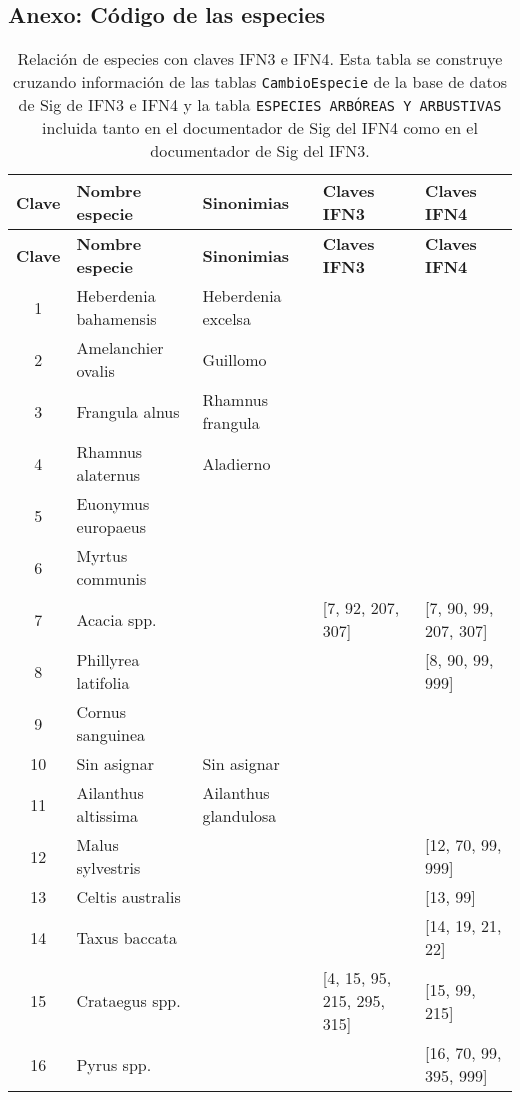 \newpage
\subsection{Anexo: Código de las especies}\label{sec:especies}

\begin{landscape}
\begin{longtable}{|c|p{4cm}|p{4cm}|p{4cm}|p{4cm}|}
\caption{Relación de especies con claves IFN3 e IFN4. Esta tabla se construye cruzando información de las tablas \texttt{CambioEspecie} de la base de datos de Sig de IFN3 e IFN4 y la tabla \texttt{ESPECIES ARBÓREAS Y ARBUSTIVAS} incluida tanto en el documentador de Sig del IFN4 como en el documentador de Sig del IFN3.} \\
\hline
\textbf{Clave} & \textbf{Nombre especie} & \textbf{Sinonimias} & \textbf{Claves IFN3} & \textbf{Claves IFN4} \\
\hline
\endfirsthead
\hline \textbf{Clave} & \textbf{Nombre especie} & \textbf{Sinonimias} & \textbf{Claves IFN3} & \textbf{Claves IFN4} \\
\hline
\endhead
1 & Heberdenia bahamensis & Heberdenia excelsa &  &  \\
\hline
2 & Amelanchier ovalis & Guillomo &  &  \\
\hline
3 & Frangula alnus & Rhamnus frangula &  &  \\
\hline
4 & Rhamnus alaternus & Aladierno &  &  \\
\hline
5 & Euonymus europaeus &  &  &  \\
\hline
6 & Myrtus communis &  &  &  \\
\hline
7 & Acacia spp. &  & [7, 92, 207, 307] & [7, 90, 99, 207, 307] \\
\hline
8 & Phillyrea latifolia &  &  & [8, 90, 99, 999] \\
\hline
9 & Cornus sanguinea &  &  &  \\
\hline
10 & Sin asignar & Sin asignar &  &  \\
\hline
11 & Ailanthus altissima & Ailanthus glandulosa &  &  \\
\hline
12 & Malus sylvestris &  &  & [12, 70, 99, 999] \\
\hline
13 & Celtis australis &  &  & [13, 99] \\
\hline
14 & Taxus baccata &  &  & [14, 19, 21, 22] \\
\hline
15 & Crataegus spp. &  & [4, 15, 95, 215, 295, 315] & [15, 99, 215] \\
\hline
16 & Pyrus spp. &  &  & [16, 70, 99, 395, 999] \\

\end{longtable}
\end{landscape}
